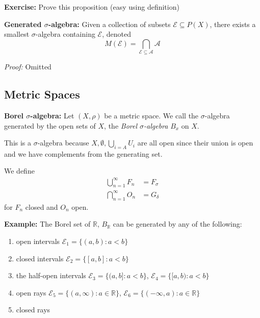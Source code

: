 \documentclass[12pt]{report}
\newcommand{\R}{\mathbb{R}}
\newcommand{\Ec}{\mathcal{E}}
\newcommand{\A}{\mathcal{A}}
\newcommand{\Fc}{\mathcal{F}}
\newcommand{\sub}{\subseteq}
\newenvironment*{tbox}[2][gray]{
    \begin{tcolorbox}[
        parbox=false,
        colback=#1!5!white,
        colframe=#1!75!black,
        breakable,
        title={#2}
    ]}
    {\end{tcolorbox}}
\newenvironment*{exercise}[1][red]{
    \begin{tcolorbox}[
        parbox=false,
        colback=#1!5!white,
        colframe=#1!75!black,
        breakable
    ]}
    {\end{tcolorbox}}
\begin{document}
        \begin{tbox}{\textbf{Proposition:} Let $\A_1, \A_2$ be two $\sigma$-algebras on $X$. Then $\A_1 \cap \A_2$ is also a $\sigma$-algebra}
            \begin{exercise}
                \textbf{Exercise:} Prove this proposition (easy using definition)
            \end{exercise}
        \end{tbox}

        \textbf{Generated $\sigma$-algebra:} Given a collection of subsets $\Ec \sub P(X)$, there exists a smallest $\sigma$-algebra containing $\Ec$, denoted 
        \[M(\Ec) = \bigcap_{\Ec \sub \A} \A\]

        \begin{tbox}{\textbf{Lemma:} $\Ec \sub M(\Fc) \implies M(\Ec) \sub M(\Fc)$}
            \emph{Proof:} Omitted
        \end{tbox}

    \subsection*{Metric Spaces}
        \textbf{Borel $\sigma$-algebra:} Let $(X, \rho)$ be a metric space. We call the $\sigma$-algebra generated by the open sets of $X$, the \emph{Borel $\sigma$-algebra} $B_x$ on $X$. 
    
        This is a $\sigma$-algebra because $X, \emptyset, \bigcup_{i=A} U_i$ are all open since their union is open and we have complements from the generating set. 

        We define 
        \begin{align*}
            \bigcup_{n=1}^\infty F_n &= F_{\sigma}\\ 
            \bigcap_{n=1}^\infty O_n &= G_{\delta}
        \end{align*}
        for $F_n$ closed and $O_n$ open. 

        \textbf{Example:} The Borel set of $\R$, $B_{\R}$ can be generated by any of the following:
        \begin{enumerate}
            \item open intervals $\Ec_1 = \{(a, b) : a < b\}$
            \item closed intervals $\Ec_2 = \{[a, b]: a < b\}$ 
            \item the half-open intervals $\Ec_3 = \{(a, b]: a < b\}$, $\Ec_4 = \{[a, b): a < b\}$
            \item open rays $\Ec_5 = \{(a, \infty): a \in \R\}$, $\Ec_6 = \{(-\infty, a): a \in \R\}$
            \item closed rays 
        \end{enumerate}
\end{document}
